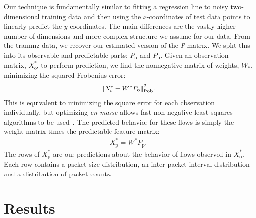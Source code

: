 \documentclass[conference]{IEEEtran}
\begin{document}
Our technique is fundamentally similar to fitting a regression line to noisy two-dimensional training data and then using the $x$-coordinates of test data points to linearly predict the $y$-coordinates.
The main differences are the vastly higher number of dimensions and more complex structure we assume for our data.
From the training data, we recover our estimated version of the $P$ matrix.
We split this into its observable and predictable parts: $P_\text{o}$ and $P_\text{p}$.
Given an observation matrix, $X^*_\text{o}$, to perform prediction, we find the nonnegative matrix of weights, $W_*$, minimizing the squared Frobenius error:
\begin{align}
  {\left\lVert X^*_\text{o} - W^* P_\text{o}\right\rVert}^2_\text{frob}.
\end{align}
This is equivalent to minimizing the square error for each observation individually, but optimizing \emph{en masse} allows fast non-negative least squares algorithms to be used~\cite{Benthem04,Kim08:block-pivot}.
The predicted behavior for these flows is simply the weight matrix times the predictable feature matrix:
\begin{align}
  X^*_\text{p} = W^* P_\text{p}.
\end{align}
The rows of $X^*_\text{p}$ are our predictions about the behavior of flows observed in $X^*_\text{o}$.
Each row contains a packet size distribution, an inter-packet interval distribution and a distribution of packet counts.


\section{Results}
\end{document}
